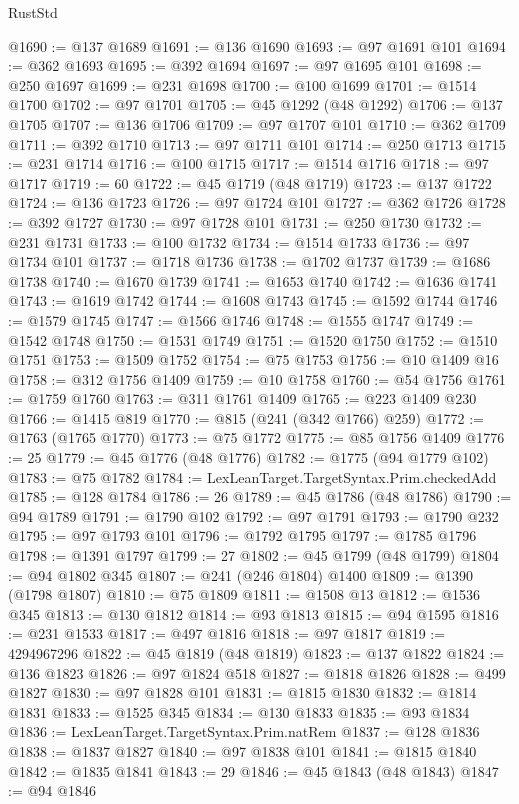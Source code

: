 \begin{lexlean}{RustStd}
\begin{coremodule}
@1690 := @137 @1689
@1691 := @136 @1690
@1693 := @97 @1691 @101
@1694 := @362 @1693
@1695 := @392 @1694
@1697 := @97 @1695 @101
@1698 := @250 @1697
@1699 := @231 @1698
@1700 := @100 @1699
@1701 := @1514 @1700
@1702 := @97 @1701
@1705 := @45 @1292 (@48 @1292)
@1706 := @137 @1705
@1707 := @136 @1706
@1709 := @97 @1707 @101
@1710 := @362 @1709
@1711 := @392 @1710
@1713 := @97 @1711 @101
@1714 := @250 @1713
@1715 := @231 @1714
@1716 := @100 @1715
@1717 := @1514 @1716
@1718 := @97 @1717
@1719 := 60
@1722 := @45 @1719 (@48 @1719)
@1723 := @137 @1722
@1724 := @136 @1723
@1726 := @97 @1724 @101
@1727 := @362 @1726
@1728 := @392 @1727
@1730 := @97 @1728 @101
@1731 := @250 @1730
@1732 := @231 @1731
@1733 := @100 @1732
@1734 := @1514 @1733
@1736 := @97 @1734 @101
@1737 := @1718 @1736
@1738 := @1702 @1737
@1739 := @1686 @1738
@1740 := @1670 @1739
@1741 := @1653 @1740
@1742 := @1636 @1741
@1743 := @1619 @1742
@1744 := @1608 @1743
@1745 := @1592 @1744
@1746 := @1579 @1745
@1747 := @1566 @1746
@1748 := @1555 @1747
@1749 := @1542 @1748
@1750 := @1531 @1749
@1751 := @1520 @1750
@1752 := @1510 @1751
@1753 := @1509 @1752
@1754 := @75 @1753
@1756 := @10 @1409 @16
@1758 := @312 @1756 @1409
@1759 := @10 @1758
@1760 := @54 @1756
@1761 := @1759 @1760
@1763 := @311 @1761 @1409
@1765 := @223 @1409 @230
@1766 := @1415 @819
@1770 := @815 (@241 (@342 @1766) @259)
@1772 := @1763 (@1765 @1770)
@1773 := @75 @1772
@1775 := @85 @1756 @1409
@1776 := 25
@1779 := @45 @1776 (@48 @1776)
@1782 := @1775 (@94 @1779 @102)
@1783 := @75 @1782
@1784 := LexLeanTarget.TargetSyntax.Prim.checkedAdd
@1785 := @128 @1784
@1786 := 26
@1789 := @45 @1786 (@48 @1786)
@1790 := @94 @1789
@1791 := @1790 @102
@1792 := @97 @1791
@1793 := @1790 @232
@1795 := @97 @1793 @101
@1796 := @1792 @1795
@1797 := @1785 @1796
@1798 := @1391 @1797
@1799 := 27
@1802 := @45 @1799 (@48 @1799)
@1804 := @94 @1802 @345
@1807 := @241 (@246 @1804) @1400
@1809 := @1390 (@1798 @1807)
@1810 := @75 @1809
@1811 := @1508 @13
@1812 := @1536 @345
@1813 := @130 @1812
@1814 := @93 @1813
@1815 := @94 @1595
@1816 := @231 @1533
@1817 := @497 @1816
@1818 := @97 @1817
@1819 := 4294967296
@1822 := @45 @1819 (@48 @1819)
@1823 := @137 @1822
@1824 := @136 @1823
@1826 := @97 @1824 @518
@1827 := @1818 @1826
@1828 := @499 @1827
@1830 := @97 @1828 @101
@1831 := @1815 @1830
@1832 := @1814 @1831
@1833 := @1525 @345
@1834 := @130 @1833
@1835 := @93 @1834
@1836 := LexLeanTarget.TargetSyntax.Prim.natRem
@1837 := @128 @1836
@1838 := @1837 @1827
@1840 := @97 @1838 @101
@1841 := @1815 @1840
@1842 := @1835 @1841
@1843 := 29
@1846 := @45 @1843 (@48 @1843)
@1847 := @94 @1846

\end{coremodule}
\end{lexlean}
